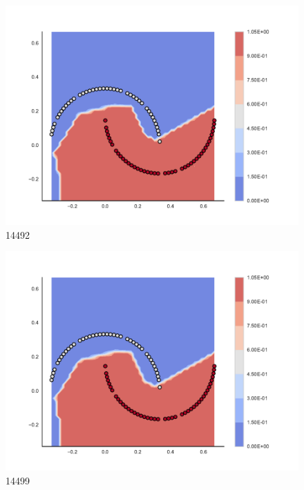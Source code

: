 \begin{subfigure}[b]{0.09\textwidth}
    \includegraphics[clip, trim=2.35cm 1.75cm 4.5cm 0cm,width=\textwidth]{img/convergence/14492.pdf}
    \caption{14492}
    \label{fig:convergence_14492}
\end{subfigure}
%
\begin{subfigure}[b]{0.09\textwidth}
    \includegraphics[clip, trim=2.35cm 1.75cm 4.5cm 0cm,width=\textwidth]{img/convergence/14499.pdf}
    \caption{14499}
    \label{fig:convergence_14499}
\end{subfigure}
%
